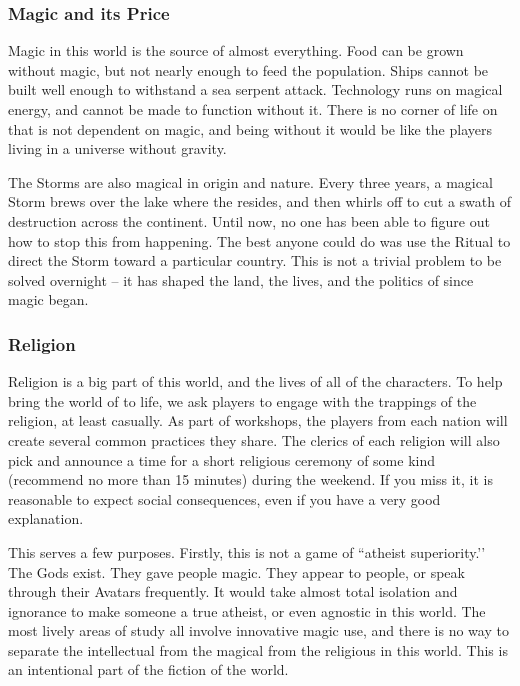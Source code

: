 \documentclass[sheet]{GL2020}
\begin{document}
\subsubsection{Magic and its Price}
Magic in this world is the source of almost everything. Food can be grown without magic, but not nearly enough to feed the population. Ships cannot be built well enough to withstand a sea serpent attack. Technology runs on magical energy, and cannot be made to function without it. There is no corner of life on \pEarth{} that is not dependent on magic, and being without it would be like the players living in a universe without gravity.

The Storms are also magical in origin and nature. Every three years, a magical Storm brews over the lake where the \pSc{} resides, and then whirls off to cut a swath of destruction across the continent. Until now, no one has been able to figure out how to stop this from happening. The best anyone could do was use the Ritual to direct the Storm toward a particular country. This is not a trivial problem to be solved overnight -- it has shaped the land, the lives, and the politics of \pEarth{} since magic began.

\subsubsection{Religion}
Religion is a big part of this world, and the lives of all of the characters. To help bring the world of \pEarth{} to life, we ask players to engage with the trappings of the religion, at least casually. As part of workshops, the players from each nation will create several common practices they share. The clerics of each religion will also pick and announce a time for a short religious ceremony of some kind (recommend no more than 15 minutes) during the weekend. If you miss it, it is reasonable to expect social consequences, even if you have a very good explanation.

This serves a few purposes. Firstly, this is not a game of ``atheist superiority.’’ The Gods exist. They gave people magic. They appear to people, or speak through their Avatars frequently. It would take almost total isolation and ignorance to make someone a true atheist, or even agnostic in this world. The most lively areas of study all involve innovative magic use, and there is no way to separate the intellectual from the magical from the religious in this world. This is an intentional part of the fiction of the world. 
\end{document}
